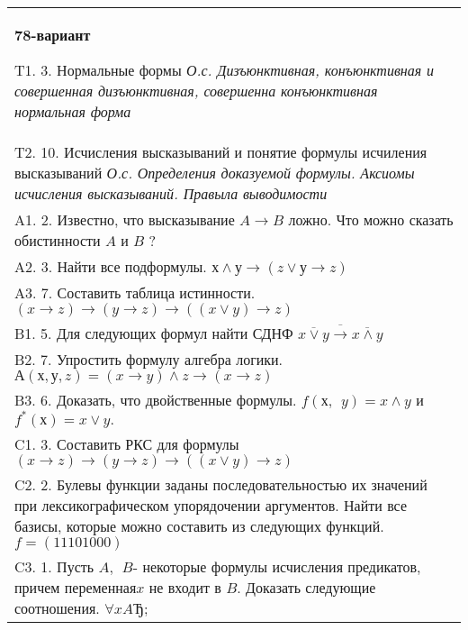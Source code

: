 \documentclass{article}
\begin{document}
\begin{tabular}{m{17cm}}
\textbf{78-вариант}
\newline

T1. 3. Нормальные формы \emph{О.с. Дизъюнктивная, конъюнктивная и совершенная дизъюнктивная, совершенна конъюнктивная нормальная форма} \\
T2. 10. Исчисления высказываний и понятие формулы исчиления высказываний \emph{О.с. Определения доказуемой формулы. Аксиомы исчисления высказываний. Правыла выводимости} \\
A1. 2. Известно, что высказывание \(A \rightarrow B\) ложно. Что можно сказать обистинности \(A\) и \(B\) ? \\
A2. 3. Найти все подформулы. \(х \land у \rightarrow (z \vee у \rightarrow z)\) \\
A3. 7. Составить таблица истинности. \((x \rightarrow z) \rightarrow (y \rightarrow z) \rightarrow ((x \vee y) \rightarrow z)\) \\
B1. 5. Для следующих формул найти СДНФ \(\overline{\overline{x \vee y} \rightarrow \overline{x \land y}}\) \\
B2. 7. Упростить формулу алгебра логики. \(А(х,у,z) = (x \rightarrow y) \land z \rightarrow (x \rightarrow z)\) \\
B3. 6. Доказать, что двойственные формулы. \(f(х,\ \ y) = x \land y\) и \(f^{*}(х) = x \vee y.\) \\
C1. 3. Составить РКС для формулы \((x \rightarrow z) \rightarrow (y \rightarrow z) \rightarrow ((x \vee y) \rightarrow z)\) \\
C2. 2. Булевы функции заданы последовательностью их значений при лексикографическом упорядочении аргументов. Найти все базисы, которые можно составить из следующих функций. \(f = (11101000)\) \\
C3. 1. Пусть \(A,\ \ B\)- некоторые формулы исчисления предикатов, причем переменная\(x\) не входит в \(B\). Доказать следующие соотношения. \(\forall xAЂ\); \\

\end{tabular}
\vspace{1cm}
\end{document}
